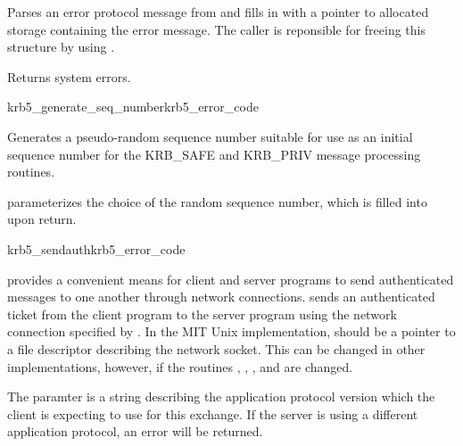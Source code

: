 Parses an error protocol message from  and fills in 
 with a pointer to allocated storage containing
the error message.  The caller is reponsible for freeing this structure by
using .

Returns system errors.

\begin{funcdecl}{krb5_generate_seq_number}{krb5_error_code}{\funcinout}
\funcin
{}
\funcout
{}
\end{funcdecl}

Generates a pseudo-random sequence number suitable for use as an initial
sequence number for the KRB_SAFE and KRB_PRIV message processing
routines.

 parameterizes the choice of the random sequence number,
which is filled into  upon return.

\begin{funcdecl}{krb5_sendauth}{krb5_error_code}
\funcinout
{}
\funcin
{}
\funcinout
{}
\funcout
{}
\end{funcdecl}

 provides a convenient means for client and
server programs to send authenticated messages to one another through
network connections.   sends an authenticated
ticket from the client program to the server program using the network
connection specified by .  In the MIT Unix implementation,
 should be a pointer to a file descriptor describing the
network socket.  This can be changed in other implementations, however,
if the routines ,
, , and
 are changed.

The paramter  is a string describing the
application protocol version which the client is expecting to use for
this exchange.  If the server is using a different application protocol,
an error will be returned.

